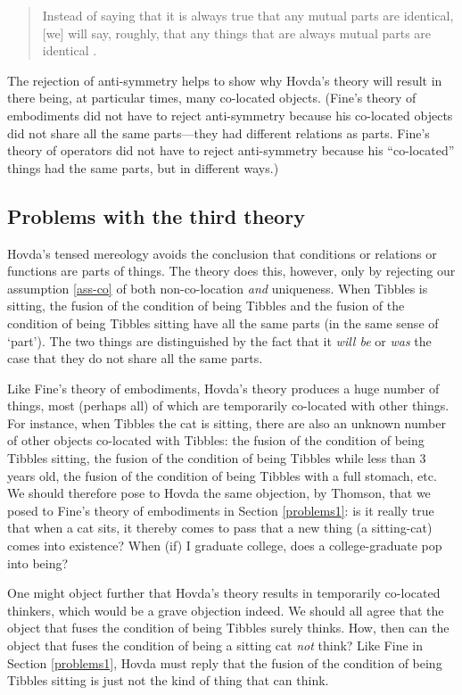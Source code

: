 \documentclass[12pt,twoside]{reedfancy}
\begin{document}
\begin{spacing}{1.25}
\begin{quote}
Instead of saying that it is always true that any mutual parts are
identical, [we] will say, roughly, that any things that are always
mutual parts are identical \citep[sec. 3.1.2]{hovda2011}.
\end{quote}

The rejection of anti-symmetry helps to show why Hovda's theory will
result in there being, at particular times, many co-located objects.
(Fine's theory of embodiments did not have to reject anti-symmetry
because his co-located objects did not share all the same parts---they
had different relations as parts.  Fine's theory of operators did not
have to reject anti-symmetry because his ``co-located'' things had the
same parts, but in different ways.)

\subsection{Problems with the third theory}
\label{problems3}
Hovda's tensed mereology avoids the conclusion that conditions or
relations or functions are parts of things.  The theory does this,
however, only by rejecting our assumption \ref{ass-co} of both
non-co-location {\em and} uniqueness.  When Tibbles is sitting, the
fusion of the condition of being Tibbles and the fusion of the
condition of being Tibbles sitting have all the same parts (in the
same sense of `part').  The two things are distinguished by the fact
that it {\em will be} or {\em was} the case that they do not share all
the same parts.

Like Fine's theory of embodiments, Hovda's theory produces a huge
number of things, most (perhaps all) of which are temporarily
co-located with other things.  For instance, when Tibbles the cat is
sitting, there are also an unknown number of other objects co-located
with Tibbles: the fusion of the condition of being Tibbles sitting,
the fusion of the condition of being Tibbles while less than 3 years
old, the fusion of the condition of being Tibbles with a full stomach,
etc.  We should therefore pose to Hovda the same objection, by
Thomson, that we posed to Fine's theory of embodiments in Section
\ref{problems1}: is it really true that when a cat sits, it thereby
comes to pass that a new thing (a sitting-cat) comes into existence?
When (if) I graduate college, does a college-graduate pop into being?

One might object further that Hovda's theory results in temporarily
co-located thinkers, which would be a grave objection indeed.  We
should all agree that the object that fuses the condition of being
Tibbles surely thinks.  How, then can the object that fuses the
condition of being a sitting cat {\em not} think?  Like Fine in
Section \ref{problems1}, Hovda must reply that the fusion of the
condition of being Tibbles sitting is just not the kind of thing that
can think.


\end{spacing}
\end{document}
